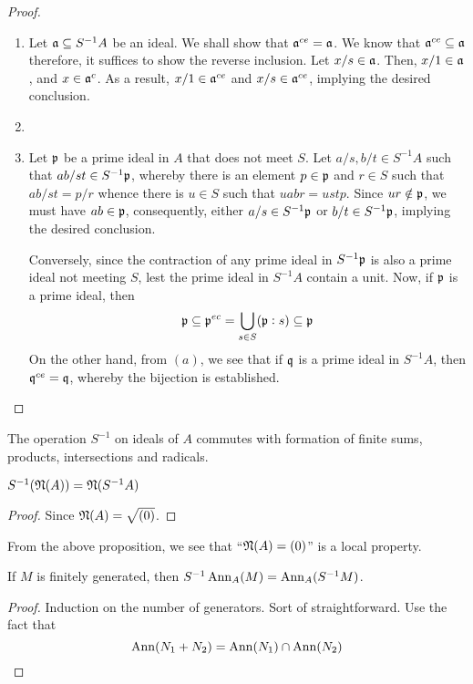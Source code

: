 \begin{proof}
\begin{enumerate}[label=(\alph*)]
    \item Let $\mathfrak a\subseteq S^{-1}A$ be an ideal. We shall show that $\mathfrak a^{ce} = \mathfrak a$. We know that $\mathfrak a^{ce}\subseteq\mathfrak a$ therefore, it suffices to show the reverse inclusion. Let $x/s\in\mathfrak a$. Then, $x/1\in\mathfrak a$, and $x\in\mathfrak a^c$. As a result, $x/1\in\mathfrak a^{ce}$ and $x/s\in\mathfrak a^{ce}$, implying the desired conclusion.
    \item 
    \item Let $\mathfrak p$ be a prime ideal in $A$ that does not meet $S$. Let $a/s,b/t\in S^{-1}A$ such that $ab/st\in S^{-1}\mathfrak p$, whereby there is an element $p\in\mathfrak p$ and $r\in S$ such that $ab/st = p/r$ whence there is $u\in S$ such that $uabr = ustp$. Since $ur\notin\mathfrak p$, we must have $ab\in\mathfrak p$, consequently, either $a/s\in S^{-1}\mathfrak p$ or $b/t\in S^{-1}\mathfrak p$, implying the desired conclusion.

    Conversely, since the contraction of any prime ideal in $S^{-1}\mathfrak p$ is also a prime ideal not meeting $S$, lest the prime ideal in $S^{-1} A$ contain a unit. Now, if $\mathfrak p$ is a prime ideal, then 
    \begin{equation*}
        \mathfrak p\subseteq\mathfrak p^{ec} = \bigcup_{s\in S}(\mathfrak p: s)\subseteq\mathfrak p
    \end{equation*}
    On the other hand, from $(a)$, we see that if $\mathfrak q$ is a prime ideal in $S^{-1}A$, then $\mathfrak q^{ce} = \mathfrak q$, whereby the bijection is established.
\end{enumerate}
\end{proof}

\begin{proposition}
    The operation $S^{-1}$ on ideals of $A$ commutes with formation of finite sums, products, intersections and radicals.
\end{proposition}

\begin{corollary}
    $S^{-1}(\mathfrak N(A)) = \mathfrak N(S^{-1}A)$
\end{corollary}
\begin{proof}
    Since $\mathfrak N(A) = \sqrt{(0)}$.
\end{proof}

From the above proposition, we see that ``$\mathfrak N(A) = (0)$'' is a local property.

\begin{proposition}
    If $M$ is finitely generated, then $S^{-1}\operatorname{Ann}_A(M) = \operatorname{Ann}_A(S^{-1}M)$. 
\end{proposition}
\begin{proof}
    Induction on the number of generators. Sort of straightforward. Use the fact that 
    \begin{equation*}
        \operatorname{Ann}(N_1 + N_2) = \operatorname{Ann}(N_1)\cap\operatorname{Ann}(N_2)\qedhere
    \end{equation*}
\end{proof}


